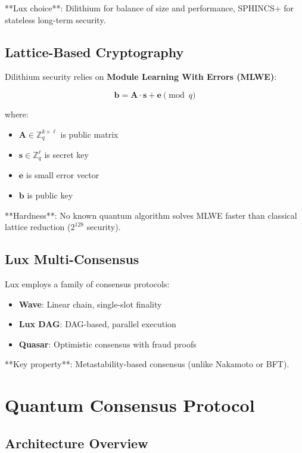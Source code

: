 \documentclass[11pt,letterpaper]{article}
\begin{document}
**Lux choice**: Dilithium for balance of size and performance, SPHINCS+ for stateless long-term security.

\subsection{Lattice-Based Cryptography}

Dilithium security relies on \textbf{Module Learning With Errors (MLWE)}:

\begin{equation}
\mathbf{b} = \mathbf{A} \cdot \mathbf{s} + \mathbf{e} \pmod{q}
\end{equation}

where:
\begin{itemize}
    \item $\mathbf{A} \in \mathbb{Z}_q^{k \times \ell}$ is public matrix
    \item $\mathbf{s} \in \mathbb{Z}_q^\ell$ is secret key
    \item $\mathbf{e}$ is small error vector
    \item $\mathbf{b}$ is public key
\end{itemize}

**Hardness**: No known quantum algorithm solves MLWE faster than classical lattice reduction ($2^{128}$ security).

\subsection{Lux Multi-Consensus}

Lux employs a family of consensus protocols:

\begin{itemize}
    \item \textbf{Wave}: Linear chain, single-slot finality
    \item \textbf{Lux DAG}: DAG-based, parallel execution
    \item \textbf{Quasar}: Optimistic consensus with fraud proofs
\end{itemize}

**Key property**: Metastability-based consensus (unlike Nakamoto or BFT).

\section{Quantum Consensus Protocol}

\subsection{Architecture Overview}
\end{document}
